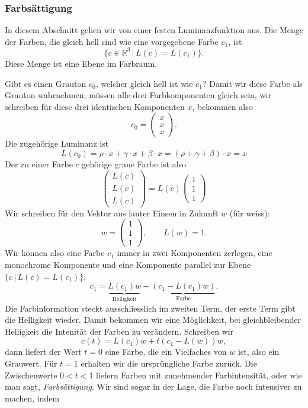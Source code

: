 \subsubsection{Farbsättigung}
In diesem Abschnitt gehen wir von einer festen Luminanzfunktion aus.
Die Menge der Farben, die gleich hell sind wie eine vorgegebene Farbe $c_1$,
ist 
\[
\{ c\in\mathbb R^3\,|\, L(c)=L(c_1)\}.
\]
Diese Menge ist eine Ebene im Farbraum.

Gibt es einen Grauton $c_0$, welcher gleich hell ist wie $c_1$?
Damit wir diese Farbe als Grauton wahrnehmen, müssen alle drei Farbkomponenten
gleich sein, wir schreiben für diese drei identischen Komponenten $x$,
bekommen also
\[
c_0=\begin{pmatrix}x\\x\\x\end{pmatrix}.
\]
Die zugehörige Luminanz ist
\[
L(c_0)=\rho\cdot x + \gamma\cdot x + \beta \cdot x=
(\rho + \gamma +\beta)\cdot x=x
\]
Der zu einer Farbe $c$ gehörige graue Farbe ist also
\[
\begin{pmatrix}L(c)\\L(c)\\L(c)\end{pmatrix}
=
L(c)\begin{pmatrix}1\\1\\1\end{pmatrix}
\]
Wir schreiben für den Vektor aus lauter Einsen in Zukunft $w$ (für weiss):
\[
w=\begin{pmatrix}1\\1\\1\end{pmatrix}, \qquad L(w)=1.
\]
Wir können also eine Farbe $c_1$ immer in zwei Komponenten zerlegen,
eine monochrome Komponente und eine Komponente parallel zur Ebene
$\{ c\,|\, L(c)=L(c_1)\}$:
\[
c_1 = \underbrace{L(c_1)w}_{\text{Helligkeit}} + \underbrace{(c_1 - L(c_1)w)}_{\text{Farbe}}.
\]
Die Farbinformation steckt ausschliesslich im zweiten Term, der erste
Term gibt die Helligkeit wieder.
Damit bekommen wir eine Möglichkeit, bei gleichbleibender Helligkeit
die Intenität der Farben zu verändern. Schreiben wir
\[
c(t)=L(c_1)w+t(c_1-L(w))w,
\]
dann liefert der Wert $t=0$ eine Farbe, die ein Vielfaches von $w$ ist, also
ein Grauwert. Für $t=1$ erhalten wir die ursprüngliche Farbe zurück.
Die Zwischenwerte $0 < t < 1$ liefern Farben mit zunehmender Farbintensität,
oder wie man sagt, {\em Farbsättigung}. 
Wir sind sogar in der Lage, die Farbe noch intensiver zu machen, indem
